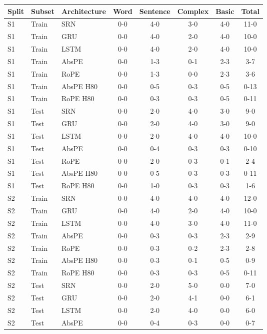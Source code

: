 \begin{table}[t]
\centering\scriptsize
\setlength{\tabcolsep}{3pt}
\begin{tabular}{@{}lllccccc@{}}
\toprule
\textbf{Split} & \textbf{Subset} & \textbf{Architecture} & \textbf{Word} & \textbf{Sentence} & \textbf{Complex} & \textbf{Basic} & \textbf{Total} \\
\midrule
S1 & Train & SRN & 0-0 & 4-0 & 3-0 & 4-0 & 11-0 \\
S1 & Train & GRU & 0-0 & 4-0 & 2-0 & 4-0 & 10-0 \\
S1 & Train & LSTM & 0-0 & 4-0 & 2-0 & 4-0 & 10-0 \\
S1 & Train & AbsPE & 0-0 & 1-3 & 0-1 & 2-3 & 3-7 \\
S1 & Train & RoPE & 0-0 & 1-3 & 0-0 & 2-3 & 3-6 \\
S1 & Train & AbsPE H80 & 0-0 & 0-5 & 0-3 & 0-5 & 0-13 \\
S1 & Train & RoPE H80 & 0-0 & 0-3 & 0-3 & 0-5 & 0-11 \\
S1 & Test & SRN & 0-0 & 2-0 & 4-0 & 3-0 & 9-0 \\
S1 & Test & GRU & 0-0 & 2-0 & 4-0 & 3-0 & 9-0 \\
S1 & Test & LSTM & 0-0 & 2-0 & 4-0 & 4-0 & 10-0 \\
S1 & Test & AbsPE & 0-0 & 0-4 & 0-3 & 0-3 & 0-10 \\
S1 & Test & RoPE & 0-0 & 2-0 & 0-3 & 0-1 & 2-4 \\
S1 & Test & AbsPE H80 & 0-0 & 0-5 & 0-3 & 0-3 & 0-11 \\
S1 & Test & RoPE H80 & 0-0 & 1-0 & 0-3 & 0-3 & 1-6 \\
S2 & Train & SRN & 0-0 & 4-0 & 4-0 & 4-0 & 12-0 \\
S2 & Train & GRU & 0-0 & 4-0 & 2-0 & 4-0 & 10-0 \\
S2 & Train & LSTM & 0-0 & 4-0 & 3-0 & 4-0 & 11-0 \\
S2 & Train & AbsPE & 0-0 & 0-3 & 0-3 & 2-3 & 2-9 \\
S2 & Train & RoPE & 0-0 & 0-3 & 0-2 & 2-3 & 2-8 \\
S2 & Train & AbsPE H80 & 0-0 & 0-3 & 0-1 & 0-5 & 0-9 \\
S2 & Train & RoPE H80 & 0-0 & 0-3 & 0-3 & 0-5 & 0-11 \\
S2 & Test & SRN & 0-0 & 2-0 & 5-0 & 0-0 & 7-0 \\
S2 & Test & GRU & 0-0 & 2-0 & 4-1 & 0-0 & 6-1 \\
S2 & Test & LSTM & 0-0 & 2-0 & 4-0 & 0-0 & 6-0 \\
S2 & Test & AbsPE & 0-0 & 0-4 & 0-3 & 0-0 & 0-7 \\

\end{tabular}
\end{table}
